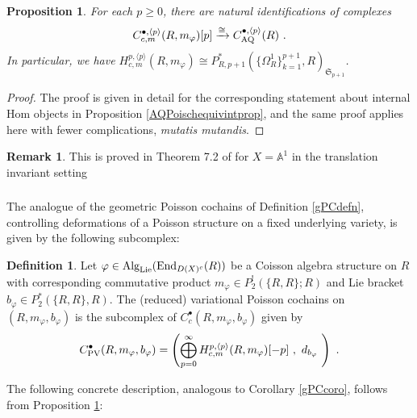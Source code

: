 \documentclass[11pt]{amsart}
\numberwithin{equation}{section}
\newtheorem{prop}[theo]{Proposition}
\theoremstyle{definition}
\newtheorem{defn}[theo]{Definition}
\newtheorem{rmk}[theo]{Remark}
\newcommand{\bb}{\mathbb}
\newcommand{\mf}{\mathfrak}
\newcommand{\AQ}{{\textup{AQ}}}
\newcommand{\End}{{\textup{End}}}
\newcommand{\Alg}{{\textup{Alg}}}
\newcommand{\Lie}{{\textup{Lie}}}
\newcommand{\Ss}{{{\mf{S}}}}
\newcommand{\PV}{{{\textup{PV}}}}
\newcommand{\0}{{\textbf{0}}}
\newcommand{\DD}{{D}}
\def \mf{\mathfrak}
\begin{document}
\begin{prop}\label{AQPoischequivprop} For each $p\geq 0$, there are natural identifications of complexes
	\[
	C^{\bullet,\langle p \rangle}_{c,m}(R,m_\varphi)[p] \xrightarrow{\cong} C^{\bullet,\langle p \rangle}_\AQ(R) \ .
	\]
	In particular, we have $H^{p,\langle p \rangle}_{c,m}(R,m_\varphi) \cong P_{R,p+1}^*(\{\Omega^1_R\}_{k=1}^{p+1},R)_{\Ss_{p+1}}$.
\end{prop}
\begin{proof} The proof is given in detail for the corresponding statement about internal Hom objects in Proposition \ref{AQPoischequivintprop}, and the same proof applies here with fewer complications, \emph{mutatis mutandis}.
\end{proof}

\begin{rmk}
This is proved in Theorem 7.2 of \cite{BDHKV21} for $X=\bb A^1$ in the translation invariant setting
\end{rmk}

\subsubsection{} The analogue of the geometric Poisson cochains of Definition \ref{gPCdefn}, controlling deformations of a Poisson structure on a fixed underlying variety, is given by the following subcomplex:

\begin{defn}\label{gPCchdefn} 
Let $\varphi \in \Alg_\Lie(\End_{\DD(X)^c}(R))$ be a Coisson algebra 
structure on $R$ with corresponding commutative product $m_\varphi\in P_2^!(\{R,R\};R)$ and Lie bracket $b_\varphi \in P_2^*(\{R,R\},R)$. The (reduced) variational Poisson cochains on $(R,m_\varphi,b_\varphi)$ is the subcomplex of $C_c^\bullet(R,m_\varphi,b_\varphi)$ given by
	\[ C^\bullet_\PV(R,m_\varphi,b_\varphi)= \left( \bigoplus_{p=0}^\infty H^{p,\langle p \rangle}_{c,m}(R,m_\varphi)[-p] \ , \ d_{b_\varphi}  \ \right)  \ .\]
\end{defn}

The following concrete description, analogous to Corollary \ref{gPCcoro}, follows from Proposition \ref{AQPoischequivprop}:
\end{document}
